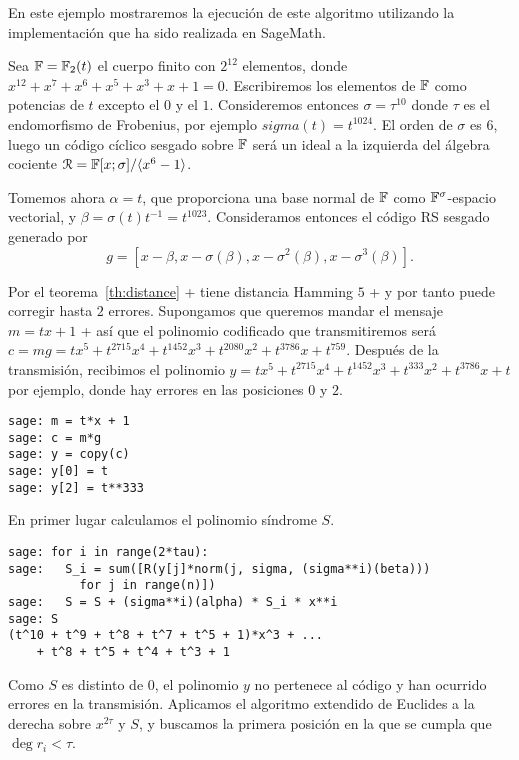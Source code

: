 \begin{exampleth}
En este ejemplo mostraremos la ejecución de este algoritmo utilizando la implementación que ha sido realizada en SageMath.

Sea \(\mathbb{F} = \mathbb{F}_2(t)\) el cuerpo finito con  \(2^{12}\) elementos, donde \(x^{12} + x^{7} + x^{6} + x^{5} + x^{3} + x + 1 = 0\). Escribiremos los elementos de \(\mathbb{F}\) como potencias de \(t\) excepto el \(0\) y el \(1\). Consideremos entonces \(\sigma = \tau^{10}\) donde  \(\tau\) es el endomorfismo de Frobenius, por ejemplo \(sigma(t) = t^{1024}\). El orden de \(\sigma\) es 6, luego un código cíclico sesgado sobre \(\mathbb{F}\) será un ideal a la izquierda del álgebra cociente  \( \mathcal{R} = \mathbb{F}[x;\sigma] / \langle x^{6} - 1\rangle\).

Tomemos ahora \(\alpha = t\), que proporciona una base normal de \(\mathbb{F}\) como \(\mathbb{F}^{\sigma}\)-espacio vectorial, y \(\beta = \sigma(t)t^{-1} = t^{1023}\). Consideramos entonces el código RS sesgado generado por
\[
    g = [x - \beta, x - \sigma(\beta), x - \sigma^{2}(\beta), x - \sigma^{3}(\beta)]
.\]

Por el teorema~\ref{th:distance} + tiene distancia Hamming \(5\) + y por tanto puede corregir hasta \(2\) errores. Supongamos que queremos mandar el mensaje \(m = tx +1\) + así que el polinomio codificado que transmitiremos será \(c = mg =  tx^{5} + t^{2715}x^{4} + t^{1452}x^{3} + t^{2080}x^{2} + t^{3786}x + t^{759} \). Después de la transmisión, recibimos el polinomio \(y = tx^{5} + t^{2715}x^{4} + t^{1452}x^{3} + t^{333}x^{2} + t^{3786}x + t\) por ejemplo, donde hay errores en las posiciones \(0\) y \(2\).

\begin{lstlisting}
sage: m = t*x + 1
sage: c = m*g
sage: y = copy(c)
sage: y[0] = t
sage: y[2] = t**333
\end{lstlisting}

En primer lugar calculamos el polinomio síndrome \(S\).
\begin{lstlisting}
sage: for i in range(2*tau):
sage:   S_i = sum([R(y[j]*norm(j, sigma, (sigma**i)(beta)))
          for j in range(n)])
sage:   S = S + (sigma**i)(alpha) * S_i * x**i
sage: S
(t^10 + t^9 + t^8 + t^7 + t^5 + 1)*x^3 + ...
    + t^8 + t^5 + t^4 + t^3 + 1
\end{lstlisting}

Como \(S\) es distinto de \(0\), el polinomio \(y\) no pertenece al código y han ocurrido errores en la transmisión. Aplicamos el algoritmo extendido de Euclides a la derecha sobre \(x^{2\tau}\) y \(S\), y buscamos la primera posición en la que se cumpla que \(\deg r_i < \tau\).


\end{exampleth}
